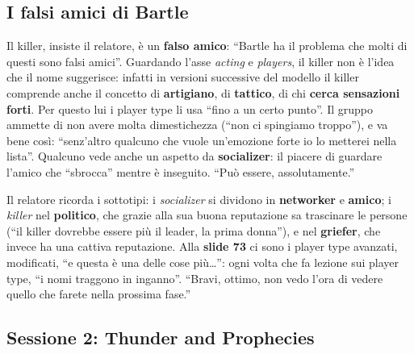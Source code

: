 \subsection{I falsi amici di Bartle}

Il killer, insiste il relatore, è un \textbf{falso amico}: ``Bartle ha il
problema che molti di questi sono falsi amici''. Guardando l'asse \emph{acting} e
\emph{players}, il killer non è l'idea che il nome suggerisce: infatti in
versioni successive del modello il killer comprende anche il concetto di
\textbf{artigiano}, di \textbf{tattico}, di chi \textbf{cerca sensazioni forti}.
Per questo lui i player type li usa ``fino a un certo punto''. Il gruppo ammette di
non avere molta dimestichezza (``non ci spingiamo troppo''), e va bene così:
``senz'altro qualcuno che vuole un'emozione forte io lo metterei nella lista''.
Qualcuno vede anche un aspetto da \textbf{socializer}: il piacere di guardare
l'amico che ``sbrocca'' mentre è inseguito. ``Può essere, assolutamente.''

Il relatore ricorda i sottotipi: i \emph{socializer} si dividono in
\textbf{networker} e \textbf{amico}; i \emph{killer} nel \textbf{politico}, che
grazie alla sua buona reputazione sa trascinare le persone (``il killer dovrebbe
essere più il leader, la prima donna''), e nel \textbf{griefer}, che invece ha una
cattiva reputazione. Alla \textbf{slide 73} ci sono i player type avanzati,
modificati, ``e questa è una delle cose più\dots'': ogni volta che fa lezione sui
player type, ``i nomi traggono in inganno''. ``Bravi, ottimo, non vedo l'ora di
vedere quello che farete nella prossima fase.''

\subsection{Sessione 2: Thunder and Prophecies}

